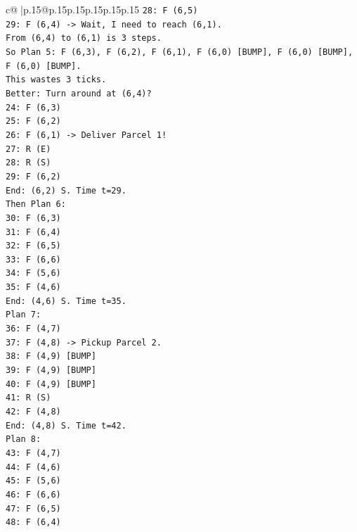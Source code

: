 \documentclass{article}
\begin{document}
{\begin{supertabular}{c@{$\;$}|p{.15\linewidth}@{}p{.15\linewidth}p{.15\linewidth}p{.15\linewidth}p{.15\linewidth}p{.15\linewidth}}
{{{\texttt{28: F (6,5)} \\
\texttt{29: F (6,4) {-}> Wait, I need to reach (6,1).} \\
\texttt{From (6,4) to (6,1) is 3 steps.} \\
\texttt{So Plan 5: F (6,3), F (6,2), F (6,1), F (6,0) {[}BUMP{]}, F (6,0) {[}BUMP{]}, F (6,0) {[}BUMP{]}.} \\
\texttt{This wastes 3 ticks.} \\
\texttt{Better: Turn around at (6,4)?} \\
\texttt{24: F (6,3)} \\
\texttt{25: F (6,2)} \\
\texttt{26: F (6,1) {-}> Deliver Parcel 1!} \\
\texttt{27: R (E)} \\
\texttt{28: R (S)} \\
\texttt{29: F (6,2)} \\
\texttt{End: (6,2) S. Time t=29.} \\
\texttt{Then Plan 6:} \\
\texttt{30: F (6,3)} \\
\texttt{31: F (6,4)} \\
\texttt{32: F (6,5)} \\
\texttt{33: F (6,6)} \\
\texttt{34: F (5,6)} \\
\texttt{35: F (4,6)} \\
\texttt{End: (4,6) S. Time t=35.} \\
\texttt{Plan 7:} \\
\texttt{36: F (4,7)} \\
\texttt{37: F (4,8) {-}> Pickup Parcel 2.} \\
\texttt{38: F (4,9) {[}BUMP{]}} \\
\texttt{39: F (4,9) {[}BUMP{]}} \\
\texttt{40: F (4,9) {[}BUMP{]}} \\
\texttt{41: R (S)} \\
\texttt{42: F (4,8)} \\
\texttt{End: (4,8) S. Time t=42.} \\
\texttt{Plan 8:} \\
\texttt{43: F (4,7)} \\
\texttt{44: F (4,6)} \\
\texttt{45: F (5,6)} \\
\texttt{46: F (6,6)} \\
\texttt{47: F (6,5)} \\
\texttt{48: F (6,4)} \\
}}}
\end{supertabular}}
\end{document}
